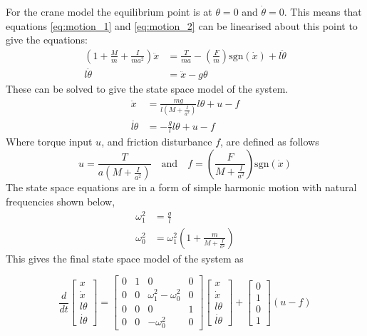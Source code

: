 \documentclass{article}
\begin{document}
For the crane model the equilibrium point is at $\theta = 0$ and $\dot{\theta} = 0$.
This means that equations \ref{eq:motion_1} and \ref{eq:motion_2} can be linearised about this point to give the equations:
\begin{align}
  \left( 1 + \frac{M}{m} + \frac{I}{ma^2} \right) \ddot{x} &= \frac{T}{ma} - \left(\frac{F}{m}\right)\text{sgn}(\dot{x}) + l \ddot{\theta} \label{eq:crane_motion_1} \\
  l \ddot{\theta} &= \ddot{x} - g\theta \label{eq:crane_motion_2}
\end{align}
These can be solved to give the state space model of the system.
\begin{align}
  \ddot{x} &= \frac{mg}{l\left(M+\frac{I}{a^2}\right)} l\theta + u - f \\
  \ddot{l\theta} &= -\frac{g}{l}l\theta + u - f
\end{align}
Where torque input $u$, and friction disturbance $f$, are defined as follows
\begin{equation}
  u = \frac{T}{a\left(M+\frac{I}{a^2}\right)} \quad \text{and} \quad f = \left(\frac{F}{M + \frac{I}{a^2}} \right) \text{sgn} (\dot{x})
\end{equation}
The state space equations are in a form of simple harmonic motion with natural frequencies shown below,
\begin{align}
  \omega_1^2 &= \frac{g}{l} \\
  \omega_0^2 &= \omega_1^2\left(1 + \frac{m}{M+\frac{I}{a^2}} \right)
\end{align}
This gives the final state space model of the system as

\begin{equation}
  \frac{d}{dt} 
  \begin{bmatrix}
     x \\ \dot{x} \\ l\theta \\ \dot{l\theta} \end{bmatrix} = \begin{bmatrix} 
      0 & 1 & 0 & 0 \\ 0 & 0 & \omega_1^2 - \omega_0^2 & 0 \\ 0 & 0 & 0 & 1 \\ 0 & 0 & -\omega_0^2 & 0 \end{bmatrix} \begin{bmatrix} 
        x \\ \dot{x} \\ l\theta \\ \dot{l\theta} \end{bmatrix} + \begin{bmatrix} 
          0 \\ 1 \\ 0 \\ 1 \end{bmatrix} (u - f)
\end{equation}
\end{document}
